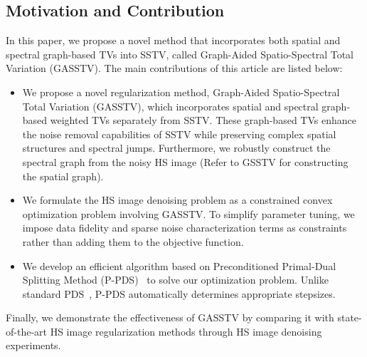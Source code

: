 \subsection{Motivation and Contribution}
\label{sec:contribution}
In this paper, we propose a novel method that incorporates both spatial and spectral graph-based TVs into SSTV, called Graph-Aided Spatio-Spectral Total Variation (GASSTV).
The main contributions of this article are listed below:
\begin{itemize}
    \setlength{\leftskip}{-10pt}
    \item We propose a novel regularization method, Graph-Aided Spatio-Spectral Total Variation (GASSTV), which incorporates spatial and spectral graph-based weighted TVs separately from SSTV. These graph-based TVs enhance the noise removal capabilities of SSTV while preserving complex spatial structures and spectral jumps. Furthermore, we robustly construct the spectral graph from the noisy HS image (Refer to GSSTV for constructing the spatial graph).
    \item We formulate the HS image denoising problem as a constrained convex optimization problem involving GASSTV. To simplify parameter tuning, we impose data fidelity and sparse noise characterization terms as constraints rather than adding them to the objective function.
    \item We develop an efficient algorithm based on Preconditioned Primal-Dual Splitting Method (P-PDS)~\cite{Pock2011PPDS, Naganuma2023PPDS} to solve our optimization problem. Unlike standard PDS~\cite{Chambolle2011PDS, Condat2013PDS}, P-PDS automatically determines appropriate stepsizes.
\end{itemize}
Finally, we demonstrate the effectiveness of GASSTV by comparing it with state-of-the-art HS image regularization methods through HS image denoising experiments.